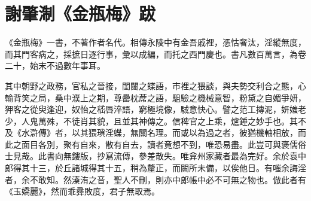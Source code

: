 \chapter*{謝肇淛《金瓶梅》跋}

《金瓶梅》一書，不著作者名代。相傳永陵中有金吾戚裡，憑怙奢汰，淫縱無度，而其門客病之，採摭日逐行事，彙以成編，而托之西門慶也。書凡數百萬言，為卷二十，始末不過數年事耳。

其中朝野之政務，官私之晉接，閨闥之蝶語，市裡之猥談，與夫勢交利合之態，心輸背笑之局，桑中濮上之期，尊罍枕蓆之語，駔驗之機械意智，粉黛之自媚爭妍，狎客之從臾逢迎，奴怡之嵇唇淬語，窮極境像，駥意快心。譬之范工摶泥，妍媸老少，人鬼萬殊，不徒肖其貌，且並其神傳之。信稗官之上乘，爐錘之妙手也。其不及《水滸傳》者，以其猥瑣淫蝶，無關名理。而或以為過之者，彼猶機軸相放，而此之面目各別，聚有自來，散有自去，讀者竟想不到，唯恐易盡。此豈可與褒儒俗士見哉。此書向無鏤版，抄寫流傳，參差散失。唯弇州家藏者最為完好。余於袁中郎得其十三，於丘諸城得其十五，稍為釐正，而闕所未備，以俟他日。有嗤余誨淫者，余不敢知。然溱洧之音，聖人不刪，則亦中郎帳中必不可無之物也。倣此者有《玉嬌麗》，然而乖彞敗度，君子無取焉。
  
\begin{quotation}
\end{quotation}

